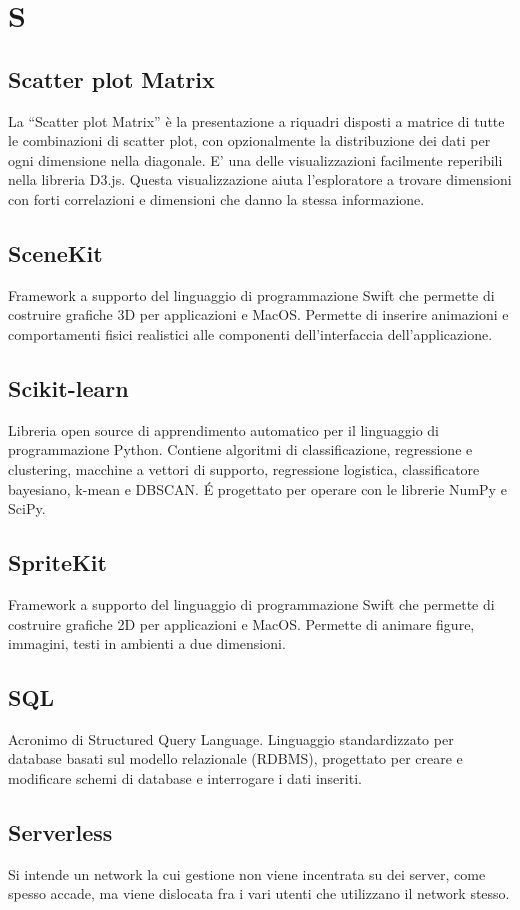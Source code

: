 \section*{S}
\markright{}
\subsection*{Scatter plot Matrix}
La “Scatter plot Matrix” è la presentazione a riquadri disposti a matrice di tutte le combinazioni di
scatter plot, con opzionalmente la distribuzione dei dati per ogni dimensione nella diagonale.
E’ una delle visualizzazioni facilmente reperibili nella libreria D3.js.
Questa visualizzazione aiuta l’esploratore a trovare dimensioni con forti correlazioni e dimensioni
che danno la stessa informazione.
\subsection*{SceneKit}
Framework a supporto del linguaggio di programmazione Swift che permette di costruire grafiche 3D per applicazioni  e MacOS. Permette di inserire animazioni e comportamenti fisici realistici alle componenti dell'interfaccia dell'applicazione. 
\subsection*{Scikit-learn}
Libreria open source di apprendimento automatico per il linguaggio di programmazione Python. Contiene algoritmi di classificazione, regressione e clustering, macchine a vettori di supporto, regressione logistica, classificatore bayesiano, k-mean e DBSCAN. \'E progettato per operare con le librerie NumPy e SciPy. 
\subsection*{SpriteKit}
Framework a supporto del linguaggio di programmazione Swift che permette di costruire grafiche 2D per applicazioni  e MacOS. Permette di animare figure, immagini, testi in ambienti a due dimensioni.
\subsection*{SQL}
Acronimo di Structured Query Language. Linguaggio standardizzato per database basati sul modello relazionale (RDBMS), progettato per creare e modificare schemi di database e interrogare i dati inseriti.
\subsection*{Serverless}
Si intende un network la cui gestione non viene incentrata su dei server, come spesso accade, ma viene dislocata fra i vari utenti che utilizzano il network stesso.
